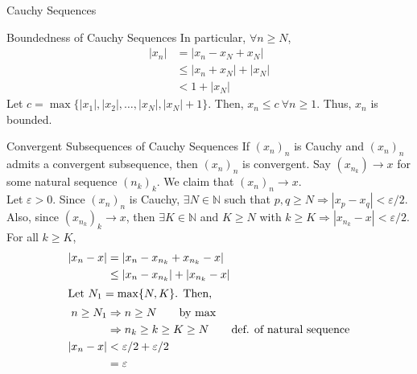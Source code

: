 \documentclass[8pt]{extarticle}
\newcommand{\N}{\mathbb{N}}
\begin{document}
\begin{problem}{Cauchy Sequences}
\begin{problem}{Boundedness of Cauchy Sequences}
      In particular, $\forall n\geq N$,
      \begin{align*}
        |x_n| &= |x_n - x_N + x_N|\\
              &\leq |x_n + x_N| + |x_N| \tag*{Triangle Inequality}\\
              &< 1 + |x_N|
      \end{align*}
      Let $c = \max\{|x_1|,|x_2|,\dots,|x_N|,|x_N|+1\}$. Then, $x_n \leq c~\forall n\geq 1$. Thus, $x_n$ is bounded.
    \end{problem}
    \begin{problem}{Convergent Subsequences of Cauchy Sequences}
      If $(x_n)_n$ is Cauchy and $(x_n)_n$ admits a convergent subsequence, then $(x_n)_n$ is convergent.
      \tcblower
      Say $(x_{n_k})\rightarrow x$ for some natural sequence $(n_k)_k$. We claim that $(x_n)_n\rightarrow x$.\\

      Let $\varepsilon > 0$. Since $(x_n)_n$ is Cauchy, $\exists N\in\N$ such that $p,q\geq N \Rightarrow |x_p-x_q| < \varepsilon/2$.\\

      Also, since $(x_{n_k})_k \rightarrow x$, then $\exists K\in\N$ and $K\geq N$ with $k\geq K \Rightarrow |x_{n_k} - x| < \varepsilon/2$.\\

      For all $k\geq K$,
      \begin{align*}
        |x_n - x| &= |x_n - x_{n_k} + x_{n_k} - x|\\
                  &\leq |x_n - x_{n_k}| + |x_{n_k} - x|\\
        \shortintertext{Let $N_1 = \max\{N,K\}$. Then,}
        n \geq N_1 &\Rightarrow n\geq N \tag*{by $\max$}\\
                   &\Rightarrow n_k \geq k \geq K \geq N \tag*{def. of natural sequence}\\
        |x_n - x| &< \varepsilon/2 + \varepsilon/2\\
                  &= \varepsilon
      \end{align*}
    \end{problem}
  \end{problem}
\end{document}
